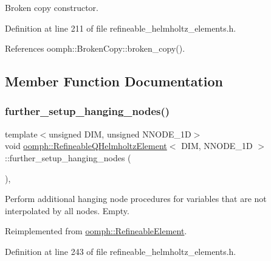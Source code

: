 Broken copy constructor. 



Definition at line 211 of file refineable\+\_\+helmholtz\+\_\+elements.\+h.



References oomph\+::\+Broken\+Copy\+::broken\+\_\+copy().



\subsection{Member Function Documentation}
\mbox{\label{classoomph_1_1RefineableQHelmholtzElement_ad277724e5c77c731d782615de8a95094}} 
\subsubsection{\texorpdfstring{further\+\_\+setup\+\_\+hanging\+\_\+nodes()}{further\_setup\_hanging\_nodes()}}
{\footnotesize\ttfamily template$<$unsigned D\+IM, unsigned N\+N\+O\+D\+E\+\_\+1D$>$ \\
void \hyperlink{classoomph_1_1RefineableQHelmholtzElement}{oomph\+::\+Refineable\+Q\+Helmholtz\+Element}$<$ D\+IM, N\+N\+O\+D\+E\+\_\+1D $>$\+::further\+\_\+setup\+\_\+hanging\+\_\+nodes (\begin{DoxyParamCaption}{ }\end{DoxyParamCaption})\hspace{0.3cm}{\ttfamily [inline]}, {\ttfamily [virtual]}}



Perform additional hanging node procedures for variables that are not interpolated by all nodes. Empty. 



Reimplemented from \hyperlink{classoomph_1_1RefineableElement_a86ea01c485f7ff822dce74b884312ccb}{oomph\+::\+Refineable\+Element}.



Definition at line 243 of file refineable\+\_\+helmholtz\+\_\+elements.\+h.

\mbox{\label{classoomph_1_1RefineableQHelmholtzElement_a0add7ad1814138f651fad0975ce8018d}} 
